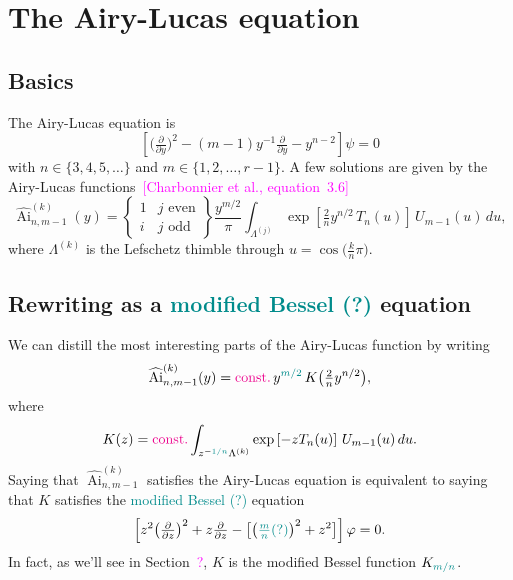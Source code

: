 \documentclass{article}
\theoremstyle{plain}
\DeclareMathOperator{\Ai}{Ai}
\begin{document}
\section{The Airy-Lucas equation}
\subsection{Basics}
The Airy-Lucas equation is
\begin{equation}\label{eqn:airy-lucas}
\left[\big(\tfrac{\partial}{\partial y}\big)^2 - (m-1) y^{-1} \tfrac{\partial}{\partial y} - y^{n-2}\right] \psi = 0
\end{equation}
with $n \in \{3, 4, 5, \ldots\}$ and $m \in \{1, 2, \ldots, r-1\}$. A few solutions are given by the Airy-Lucas functions~\textcolor{magenta}{[Charbonnier et al., equation~3.6]}
\[ \widehat{\Ai}^{(k)}_{n, m-1}(y) = \left\{\begin{array}{ll}1 & j \text{ even} \\ i & j \text{ odd}\end{array}\right\} \frac{y^{m/2}}{\pi} \int_{\Lambda^{(j)}} \exp\left[\tfrac{2}{n} y^{n/2}\,T_n(u)\right]\,U_{m-1}(u)\,du, \]
where $\Lambda^{(k)}$ is the Lefschetz thimble through $u = \cos\big(\tfrac{k}{n}\pi\big)$.
\subsection{Rewriting as a \textcolor{DarkCyan}{modified Bessel (?)} equation}
We can distill the most interesting parts of the Airy-Lucas function by writing
\[ \widehat{\Ai}^{(k)}_{n, m-1}(y) = \textcolor{magenta}{\text{const.}}\,y^{\textcolor{DarkCyan}{m/2}}\,K\big(\tfrac{2}{n} y^{n/2}\big), \]
where
\begin{equation}\label{integral:mod-bessel-rational}
K(z) = \textcolor{magenta}{\text{const.}} \int_{z^{-\textcolor{DarkCyan}{1/n}}\Lambda^{(k)}} \exp\left[-z T_n(u)\right]\,U_{m-1}(u)\,du.
\end{equation}
Saying that $\widehat{\Ai}^{(k)}_{n, m-1}$ satisfies the Airy-Lucas equation is equivalent to saying that $K$ satisfies the \textcolor{DarkCyan}{modified Bessel (?)} equation
\begin{equation}%
\left[z^2 \big(\tfrac{\partial}{\partial z}\big)^2 + z \tfrac{\partial}{\partial z} - \big[\big(\textcolor{DarkCyan}{\tfrac{m}{n} (?)}\big)^2 + z^2\big]\right] \varphi = 0.
\end{equation}
In fact, as we'll see in Section~\textcolor{magenta}{?}, $K$ is the modified Bessel function $K_{\textcolor{DarkCyan}{m/n}}$.
\end{document}
